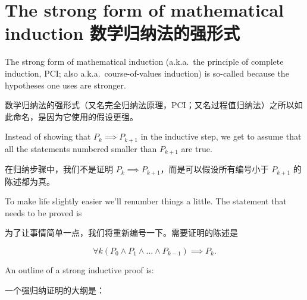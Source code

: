\newpage
 
\section{The strong form of mathematical induction 数学归纳法的强形式}
\label{sec:strong_induct}

The strong form of mathematical induction (a.k.a.\ the principle of
complete induction, PCI; also a.k.a.\ course-of-values induction) 
is so-called because the hypotheses one
uses are stronger.

数学归纳法的强形式（又名完全归纳法原理，PCI；又名过程值归纳法）之所以如此命名，是因为它使用的假设更强。

Instead of showing that $P_k \implies P_{k+1}$ in
the inductive step, we get to assume that all the statements numbered
smaller than $P_{k+1}$ are true.

在归纳步骤中，我们不是证明 $P_k \implies P_{k+1}$，而是可以假设所有编号小于 $P_{k+1}$ 的陈述都为真。

To make life slightly easier we'll
renumber things a little.  The statement that needs to be proved is

为了让事情简单一点，我们将重新编号一下。需要证明的陈述是

\[ \forall k (P_0 \land P_1 \land \ldots \land  P_{k-1}) \implies P_k.
\]

 An outline of a strong inductive proof is:

一个强归纳证明的大纲是：

